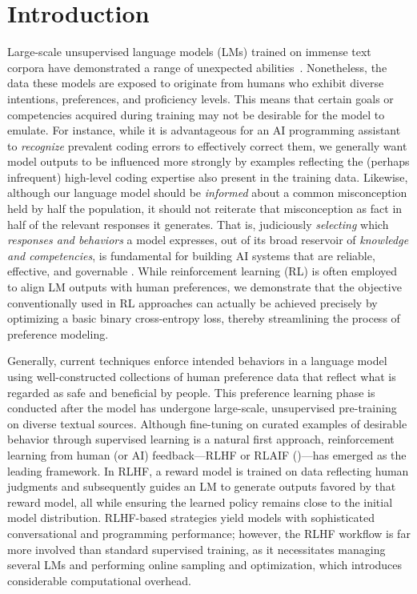 \section{Introduction}
Large-scale unsupervised language models (LMs) trained on immense text corpora have demonstrated a range of unexpected abilities~\citep{chowdhery2022palm, brown2020language, touvron2023llama, bubeck2023sparks}. Nonetheless, the data these models are exposed to originate from humans who exhibit diverse intentions, preferences, and proficiency levels. This means that certain goals or competencies acquired during training may not be desirable for the model to emulate. For instance, while it is advantageous for an AI programming assistant to \textit{recognize} prevalent coding errors to effectively correct them, we generally want model outputs to be influenced more strongly by examples reflecting the (perhaps infrequent) high-level coding expertise also present in the training data. Likewise, although our language model should be \textit{informed} about a common misconception held by half the population, it should not reiterate that misconception as fact in half of the relevant responses it generates. That is, judiciously \emph{selecting} which \emph{responses and behaviors} a model expresses, out of its broad reservoir of \textit{knowledge and competencies}, is fundamental for building AI systems that are reliable, effective, and governable \citep{ouyang2022training}. While reinforcement learning (RL) is often employed to align LM outputs with human preferences, we demonstrate that the objective conventionally used in RL approaches can actually be achieved precisely by optimizing a basic binary cross-entropy loss, thereby streamlining the process of preference modeling.

Generally, current techniques enforce intended behaviors in a language model using well-constructed collections of human preference data that reflect what is regarded as safe and beneficial by people. This preference learning phase is conducted after the model has undergone large-scale, unsupervised pre-training on diverse textual sources. Although fine-tuning on curated examples of desirable behavior through supervised learning is a natural first approach, reinforcement learning from human (or AI) feedback—RLHF or RLAIF (\citep{christiano2017deep, bai2022constitutional})—has emerged as the leading framework. In RLHF, a reward model is trained on data reflecting human judgments and subsequently guides an LM to generate outputs favored by that reward model, all while ensuring the learned policy remains close to the initial model distribution. RLHF-based strategies yield models with sophisticated conversational and programming performance; however, the RLHF workflow is far more involved than standard supervised training, as it necessitates managing several LMs and performing online sampling and optimization, which introduces considerable computational overhead.

